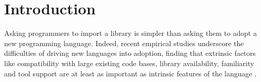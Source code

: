 \documentclass[9pt,preprint]{sigplanconf}
\begin{document}
\begin{abstract}
\end{abstract}

\section{Introduction}\label{intro}
Asking programmers to import a library is simpler than asking them to adopt a new programming language. Indeed, recent empirical studies underscore the difficulties of driving new languages into adoption, finding that extrinsic factors like compatibility with large existing code bases, library availability, familiarity and tool support are at least as important as intrinsic features of the language \cite{Meyerovich:2013:EAP:2509136.2509515,chen05}. 
\end{document}
